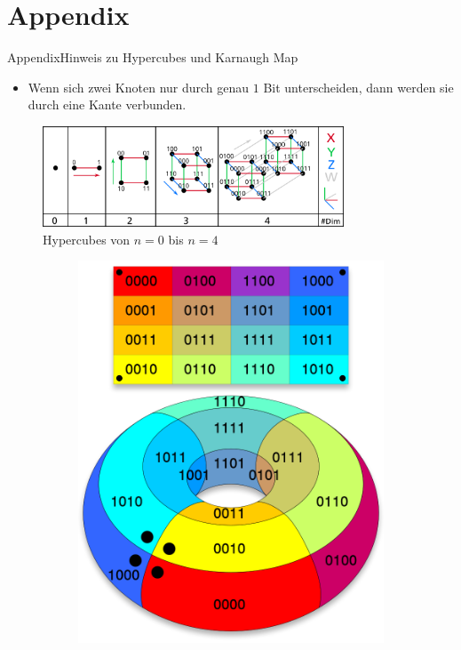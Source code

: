 
\section{Appendix}

\begin{frame}[allowframebreaks]{Appendix}{Hinweis zu Hypercubes und Karnaugh Map}
  \begin{itemize}
    \item Wenn sich zwei Knoten nur durch genau $1$ Bit unterscheiden, dann werden sie durch eine Kante verbunden.
  \end{itemize}
  \begin{figure}
      \includegraphics[width=0.8\textwidth, center]{./figures/hypercubes.png}
      \caption{Hypercubes von $n=0$ bis $n=4$}
  \end{figure}
  \newpage
  \begin{figure}
    \centering
    \begin{subfigure}{0.4\textwidth}
       \includegraphics[height=0.4\textheight, center]{./figures/donut.png}

\end{subfigure}
\end{figure}
\end{frame}
